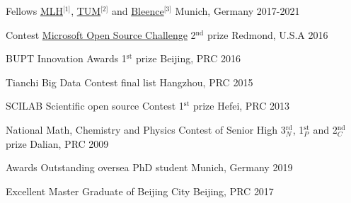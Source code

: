 




\begin{cvhonors}


\cvhonor
{Fellows} %
{\href{https://fellowship.mlh.io/}{MLH}$^{\text{[1]}}$, \href{}{TUM}$^{\text{[2]}}$ and \href{https://bleenco.com/}{Bleence}$^{\text{[3]}}$} %
{Munich, Germany} %
{2017-2021} %


\cvhonor
{Contest} %
{\href{https://www.microsoft.com/en-us/research/academic-program/microsoft-open-source-challenge/}{Microsoft Open Source Challenge} 2$^\text{nd}$ prize} %
{Redmond, U.S.A} %
{2016} %

\cvhonor
{} %
{BUPT Innovation Awards 1$^\text{st}$ prize} %
{Beijing, PRC} %
{2016} %

\cvhonor
{} %
{Tianchi Big Data Contest final list} %
{Hangzhou, PRC} %
{2015} %


\cvhonor
{} %
{SCILAB Scientific open source Contest 1$^\text{st}$ prize} %
{Hefei, PRC} %
{2013} %


\cvhonor
{} %
{National Math, Chemistry and Physics Contest of Senior High 3$^\text{rd}_N$, 1$^\text{st}_P$ and 2$^\text{nd}_C$ prize} %
{Dalian, PRC} %
{2009} %

\cvhonor
{Awards} %
{Outstanding oversea PhD student} %
{Munich, Germany} %
{2019} %

\cvhonor
{} %
{Excellent Master Graduate of Beijing City} %
{Beijing, PRC} %
{2017} %


\end{cvhonors}
